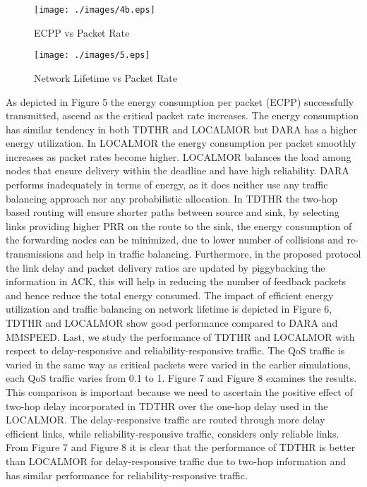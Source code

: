 \documentclass[fleqn,twoside]{article}
\begin{document}
\begin{figure}
\centering
\texttt{[image: ./images/4b.eps]}
\caption{ECPP vs Packet Rate}
\end{figure}

\begin{figure}
\centering
\texttt{[image: ./images/5.eps]}
\caption{Network Lifetime vs Packet Rate}
\end{figure}
\vskip 2mm
As depicted in Figure 5 the energy consumption per packet (ECPP) successfully transmitted, ascend as the 
critical packet rate increases.
The energy consumption has similar tendency in both TDTHR and LOCALMOR but DARA has a higher energy utilization. 
In LOCALMOR the energy consumption per packet smoothly increases as packet rates become higher.
LOCALMOR balances the load among nodes that ensure delivery within the deadline and have high reliability.
DARA performs inadequately in terms of energy, as it does neither use any traffic balancing approach nor any probabilistic
allocation. 
\vskip 2mm
In TDTHR the two-hop based routing will ensure shorter paths between source and sink, by selecting links providing 
higher PRR on the route to the sink, the energy consumption of the forwarding nodes can be 
minimized, due to lower number of collisions and re-transmissions and help in traffic balancing. 
Furthermore, in the proposed protocol the link delay and 
packet delivery ratios are updated by piggybacking the information in ACK, this will help in reducing the number of feedback
packets and hence reduce the total energy consumed. The impact of efficient energy utilization and traffic balancing on network lifetime is depicted in Figure 6, TDTHR and LOCALMOR show good performance compared to DARA and MMSPEED.
\vskip 2mm
Last, we study the performance of TDTHR and LOCALMOR with respect to delay-responsive and reliability-responsive traffic.
The QoS traffic is varied in the same way as critical packets were varied in the earlier simulations,  each QoS 
traffic varies from 0.1 to 1. Figure 7 and Figure 8 examines the results.
This comparison is important because we need to ascertain the positive effect of two-hop delay incorporated in TDTHR over
the one-hop delay used in the LOCALMOR. The delay-responsive traffic are routed through more delay efficient
links, while reliability-responsive traffic, considers only reliable links. From Figure 7 and Figure 8 it is clear that
the performance of TDTHR is better than LOCALMOR for delay-responsive traffic due to
two-hop information and has similar performance for reliability-responsive traffic.
\end{document}
